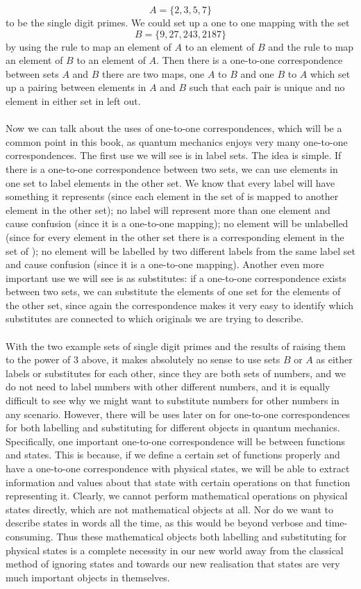 $$
A=\{2,3,5,7\}
$$
to be the single digit primes. We could set up a one to one mapping with the set 
$$
B=\{9,27,243,2187\}
$$
by using the rule  to map an element of $A$ to an element of $B$ and the rule  to map an element of $B$ to an element of $A$. Then there is a one-to-one correspondence between sets $A$ and $B$ there are two maps, one $A$ to $B$ and one $B$ to $A$ which set up a pairing between elements in $A$ and $B$ such that each pair is unique and no element in either set in left out.
\\\\
Now we can talk about the uses of one-to-one correspondences, which will be a common point in this book, as quantum mechanics enjoys very many one-to-one correspondences. The first use we will see is in label sets. The idea is simple. If there is a one-to-one correspondence between two sets, we can use elements in one set to label elements in the other set. We know that every label will have something it represents (since each element in the set of  is mapped to another element in the other set); no label will represent more than one element and cause confusion (since it is a one-to-one mapping); no element will be unlabelled (since for every element in the other set there is a corresponding element in the set of ); no element will be labelled by two different labels from the same label set and cause confusion (since it is a one-to-one mapping). Another even more important use we will see is as substitutes: if a one-to-one correspondence exists between two sets, we can substitute the elements of one set for the elements of the other set, since again the correspondence makes it very easy to identify which substitutes are connected to which originals we are trying to describe.
\\\\
With the two example sets of single digit primes and the results of raising them to the power of 3  above, it makes absolutely no sense to use sets $B$ or $A$ as either labels or substitutes for each other, since they are both sets of numbers, and we do not need to label numbers with other different numbers, and it is equally difficult to see why we might want to substitute numbers for other numbers in any scenario. However, there will be uses later on for one-to-one correspondences for both labelling and substituting for different objects in quantum mechanics. Specifically, one important one-to-one correspondence will be between functions and states. This is because, if we define a certain set of functions properly and have a one-to-one correspondence with physical states, we will be able to extract information and values about that state with certain operations on that function representing it. Clearly, we cannot perform mathematical operations on physical states directly, which are not mathematical objects at all. Nor do we want to describe states in words all the time, as this would be beyond verbose and time-consuming. Thus these mathematical objects both labelling and substituting for physical states is a complete necessity in our new world away from the classical method of ignoring states and towards our new realisation that states are very much important objects in themselves.
